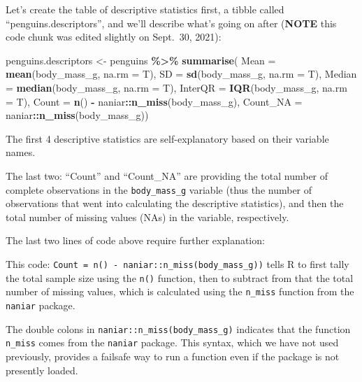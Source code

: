 \documentclass[
]{book}
\newenvironment{Shaded}{\begin{snugshade}}{\end{snugshade}}
\newcommand{\AttributeTok}[1]{\textcolor[rgb]{0.13,0.29,0.53}{#1}}
\newcommand{\FunctionTok}[1]{\textcolor[rgb]{0.13,0.29,0.53}{\textbf{#1}}}
\newcommand{\NormalTok}[1]{#1}
\newcommand{\OtherTok}[1]{\textcolor[rgb]{0.56,0.35,0.01}{#1}}
\newcommand{\SpecialCharTok}[1]{\textcolor[rgb]{0.81,0.36,0.00}{\textbf{#1}}}
\begin{document}
Let's create the table of descriptive statistics first, a tibble called ``penguins.descriptors'', and we'll describe what's going on after (\textbf{NOTE} this code chunk was edited slightly on Sept.~30, 2021):

\begin{Shaded}
\begin{Highlighting}[]
\NormalTok{penguins.descriptors }\OtherTok{\textless{}{-}}\NormalTok{ penguins }\SpecialCharTok{\%\textgreater{}\%}
  \FunctionTok{summarise}\NormalTok{( }
  \AttributeTok{Mean =} \FunctionTok{mean}\NormalTok{(body\_mass\_g, }\AttributeTok{na.rm =}\NormalTok{ T),}
  \AttributeTok{SD =} \FunctionTok{sd}\NormalTok{(body\_mass\_g, }\AttributeTok{na.rm =}\NormalTok{ T),}
  \AttributeTok{Median =} \FunctionTok{median}\NormalTok{(body\_mass\_g, }\AttributeTok{na.rm =}\NormalTok{ T),}
  \AttributeTok{InterQR =} \FunctionTok{IQR}\NormalTok{(body\_mass\_g, }\AttributeTok{na.rm =}\NormalTok{ T),}
  \AttributeTok{Count =} \FunctionTok{n}\NormalTok{() }\SpecialCharTok{{-}}\NormalTok{ naniar}\SpecialCharTok{::}\FunctionTok{n\_miss}\NormalTok{(body\_mass\_g),}
  \AttributeTok{Count\_NA =}\NormalTok{ naniar}\SpecialCharTok{::}\FunctionTok{n\_miss}\NormalTok{(body\_mass\_g))}
\end{Highlighting}
\end{Shaded}

The first 4 descriptive statistics are self-explanatory based on their variable names.

The last two: ``Count'' and ``Count\_NA'' are providing the total number of complete observations in the \texttt{body\_mass\_g} variable (thus the number of observations that went into calculating the descriptive statistics), and then the total number of missing values (NAs) in the variable, respectively.

The last two lines of code above require further explanation:

This code: \texttt{Count\ =\ n()\ -\ naniar::n\_miss(body\_mass\_g))} tells R to first tally the total sample size using the \texttt{n()} function, then to subtract from that the total number of missing values, which is calculated using the \texttt{n\_miss} function from the \texttt{naniar} package.

The double colons in \texttt{naniar::n\_miss(body\_mass\_g)} indicates that the function \texttt{n\_miss} comes from the \texttt{naniar} package. This syntax, which we have not used previously, provides a failsafe way to run a function even if the package is not presently loaded.
\end{document}
